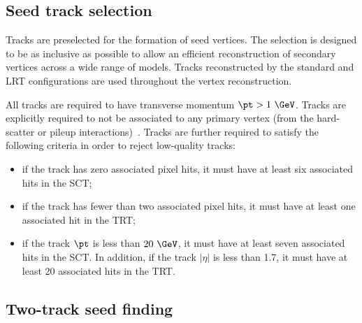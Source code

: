 \documentclass[PUB,UKenglish, texlive=2018]{\ATLASLATEXPATH atlasdoc}
\begin{document}
\subsection{Seed track selection \label{sec:vtxReco:trackSelection} }

Tracks are preselected for the formation of seed vertices. The selection is designed to be as inclusive as possible to allow an efficient reconstruction of secondary vertices across a wide range of models.
Tracks reconstructed by the standard and LRT configurations are used throughout the vertex reconstruction.

All tracks are required to have transverse momentum $\pt>1~\GeV$. Tracks are explicitly required to not be associated to any primary vertex (from the hard-scatter or pileup interactions)~\cite{Aaboud:2016rmg}. Tracks are further required to satisfy the following criteria in order to reject low-quality tracks:
\begin{itemize}
\item if the track has zero associated pixel hits, it must have at least six associated hits in the SCT;
\item if the track has fewer than two associated pixel hits, it must have at least one associated hit in the TRT;
\item if the track $\pt$ is less than $20~\GeV$, it must have at least seven associated hits in the SCT. In addition, if the track $|\eta|$ is less than 1.7, it must have at least 20 associated hits in the TRT.
\end{itemize}


\subsection{Two-track seed finding}
\end{document}

